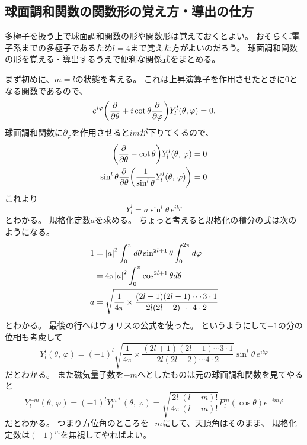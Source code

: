 \documentclass[../master.tex]{subfiles}
\begin{document}
\subsection{球面調和関数の関数形の覚え方・導出の仕方}
多極子を扱う上で球面調和関数の形や関数形は覚えておくとよい。
おそらくf電子系までの多極子であるため\(l=4\)まで覚えた方がよいのだろう。
球面調和関数の形を覚える・導出するうえで便利な関係式をまとめる。

まず初めに、\(m=l\)の状態を考える。
これは上昇演算子を作用させたときに\(0\)となる関数であるので、
\begin{equation}
	e^{i\varphi}\qty(\pdv{\theta}+i\cot\theta\pdv{\varphi})Y_l^l(\theta,\varphi)=0.
\end{equation}
球面調和関数に\(\partial_\varphi\)を作用させると\(im\)が下りてくるので、
\begin{equation}\begin{aligned}[b]
    \qty(\pdv{\theta} - \cot\theta) Y_l^l(\theta,\,\varphi) = 0 \\
	\sin^l\theta\pdv{\theta}\qty(\frac{1}{\sin^l \theta}Y_l^l(\theta,\,\varphi))=0
\end{aligned}\end{equation}
これより
\begin{equation}
	Y_l^l =a \sin^l\theta\, e^{il\varphi}
\end{equation}
とわかる。
規格化定数\(a\)を求める。
ちょっと考えると規格化の積分の式は次のようになる。
\begin{equation}\begin{aligned}[b]
    1 & = \abs{a}^2 \int_{0}^{\pi} d\theta \sin^{2l+1}\theta \int_{0}^{2\pi} d\varphi              \\
	  & = 4\pi \abs{a}^2 \int_{0}^{\pi} \cos^{2l+1}\theta d\theta                                 \\
	a & = \sqrt{\frac{1}{4\pi}\times\frac{(2l+1)(2l-1)\cdots 3\cdot 1}{2l(2l-2) \cdots 4\cdot 2}}
\end{aligned}\end{equation}
とわかる。
最後の行へはウォリスの公式を使った。
というようにして\(-1\)の分の位相も考慮して
\begin{equation}
	Y_l^l(\theta,\,\varphi)
	= (-1)^l\sqrt{\frac{1}{4\pi}\times\frac{(2l+1)(2l-1)\cdots 3\cdot 1}{2l(2l-2) \cdots 4\cdot 2}}
	\sin^l \theta \, e^{il\varphi}
\end{equation}
だとわかる。
また磁気量子数を\(-m\)へとしたものは元の球面調和関数を見てやると
\begin{equation}
	Y_l^{-m}(\theta,\,\varphi) = (-1)^l Y_l^{m*}(\theta,\,\varphi)
	= \sqrt{\frac{2l}{4\pi}\frac{(l-m)!}{(l+m)!}}P_l^m(\cos\theta)e^{-im\varphi}
\end{equation}
だとわかる。
つまり方位角のところを\(-m\)にして、天頂角はそのまま、
規格化定数は\((-1)^m\)を無視してやればよい。
\end{document}
